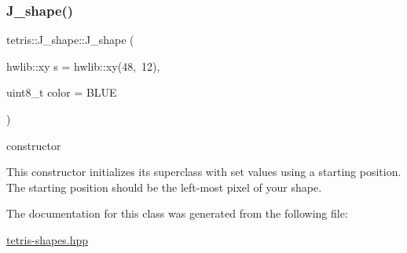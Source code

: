 \subsubsection{\texorpdfstring{J\+\_\+shape()}{J\_shape()}}
{\footnotesize\ttfamily tetris\+::\+J\+\_\+shape\+::\+J\+\_\+shape (\begin{DoxyParamCaption}\item[{hwlib\+::xy}]{s = {\ttfamily hwlib\+:\+:xy(48,~12)},  }\item[{uint8\+\_\+t}]{color = {\ttfamily BLUE} }\end{DoxyParamCaption})\hspace{0.3cm}{\ttfamily [inline]}}



constructor 

This constructor initializes its superclass with set values using a starting position. The starting position should be the left-\/most pixel of your shape. 

The documentation for this class was generated from the following file\+:\begin{DoxyCompactItemize}
\item 
\hyperlink{tetris-shapes_8hpp}{tetris-\/shapes.\+hpp}\end{DoxyCompactItemize}
